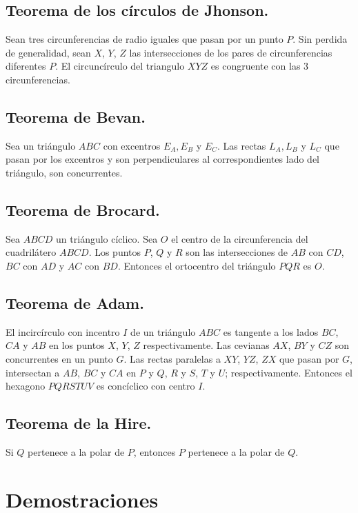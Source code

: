 \documentclass[12pt,a4paper,oneside]{book}
\begin{document}
\section{Teorema de los círculos de Jhonson.}
Sean tres circunferencias de radio iguales que pasan por un punto $P$. Sin perdida de generalidad, sean $X$, $Y$, $Z$ las intersecciones de los pares de circunferencias diferentes $P$. El circuncírculo del triangulo $XYZ$ es congruente con las 3 circunferencias.
\section{Teorema de Bevan.}
Sea un triángulo $ABC$ con excentros $E_A, E_B$ y $E_C$. Las rectas $L_A, L_B$ y $L_C$ que pasan por los excentros y son perpendiculares al correspondientes lado del triángulo, son concurrentes.
\section{Teorema de Brocard.}
Sea $ABCD$ un triángulo cíclico. Sea $O$ el centro de la circunferencia del cuadrilátero $ABCD$. Los puntos $P$, $Q$ y $R$ son las intersecciones de $AB$ con $CD$, $BC$ con $AD$ y $AC$ con $BD$. Entonces el ortocentro del triángulo $PQR$ es $O$. 
\section{Teorema de Adam.}
El incircírculo con incentro $I$ de un triángulo $ABC$ es tangente a los lados $BC$, $CA$ y $AB$ en los puntos $X$, $Y$, $Z$ respectivamente. Las cevianas  $AX$, $BY$ y $CZ$ son concurrentes en un punto $G.$ Las rectas paralelas a $XY$, $YZ$, $ZX$ que pasan por $G$, intersectan a $AB$, $BC$ y $CA$ en $P$ y $Q$, $R$ y $S$, $T$ y $U$; respectivamente. Entonces el hexagono $PQRSTUV$ es concíclico con centro $I$.
\section{Teorema de la Hire.}
Si $Q$ pertenece a la polar de $P$, entonces $P$ pertenece a la polar de $Q$.

\chapter{Demostraciones}
\end{document}
